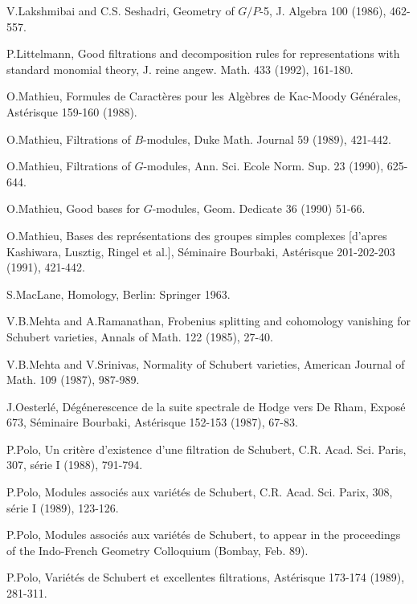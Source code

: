\begin{thebibliography}{}
 V.\@ Lakshmibai and C.S. Seshadri, Geometry of
  $G/P$-5, J. Algebra 100 (1986), 462-557.

 P.\@ Littelmann, Good filtrations and decomposition
  rules for representations with standard monomial theory, J. reine
  angew. Math. 433 (1992), 161-180.

 O.\@ Mathieu, Formules de Caract\`eres pour les
  Alg\`ebres de Kac-Moody G\'en\'erales, Ast\'erisque 159-160 (1988).

 O.\@ Mathieu, Filtrations of $B$-modules, Duke
  Math. Journal 59 (1989), 421-442.

 O.\@ Mathieu, Filtrations of $G$-modules,
  Ann. Sci. Ecole Norm. Sup. 23 (1990), 625-644.

 O.\@ Mathieu, Good bases for $G$-modules,
  Geom. Dedicate 36 (1990) 51-66.

 O.\@ Mathieu, Bases des repr\'esentations des groupes
  simples complexes [d'apres Kashiwara, Lusztig, Ringel et al.],
  S\'eminaire Bourbaki, Ast\'erisque 201-202-203 (1991), 421-442.

 S.\@ MacLane, Homology, Berlin: Springer 1963.

 V.B.\@ Mehta\pageoriginale 
 and A.\@ Ramanathan, Frobenius splitting
  and cohomology vanishing for Schubert varieties, Annals of Math. 122
  (1985), 27-40.

 V.B.\@ Mehta and V.\@ Srinivas, Normality of Schubert
  varieties, American Journal of Math. 109 (1987), 987-989.

 J.\@ Oesterl\'e, D\'eg\'enerescence de la suite
  spectrale de Hodge vers De Rham, Expos\'e 673, S\'eminaire Bourbaki,
  Ast\'erisque 152-153 (1987), 67-83.

 P.\@ Polo, Un crit\`ere d'existence d'une filtration
  de Schubert, C.R. Acad. Sci. Paris, 307, s\'erie I (1988), 791-794.

 P.\@ Polo, Modules associ\'es aux vari\'et\'es de
  Schubert, C.R. Acad. Sci. Parix, 308, s\'erie I (1989), 123-126.

 P.\@ Polo, Modules associ\'es aux vari\'et\'es de
  Schubert, to appear in the proceedings of the Indo-French Geometry
  Colloquium (Bombay, Feb. 89).

 P.\@ Polo, Vari\'et\'es de Schubert et excellentes
  filtrations, Ast\'erisque 173-174 (1989), 281-311.


\end{thebibliography}
